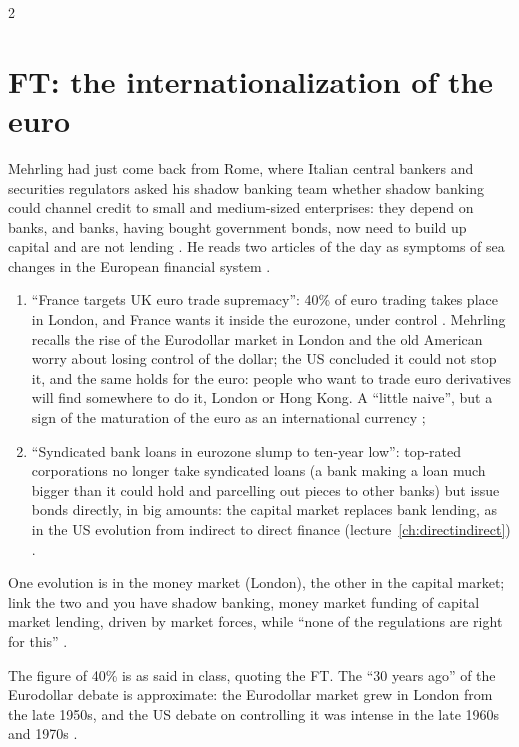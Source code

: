 \begin{paracol}{2}
\section{FT: the internationalization of the euro}\label{sec:cds-ft}

Mehrling had just come back from Rome, where Italian central bankers and securities regulators asked his shadow banking team whether shadow banking could channel
credit to small and medium-sized enterprises: they depend on banks, and banks, having bought government bonds, now need to build up capital and are not lending
. He reads two articles of the day as symptoms of sea changes in the European financial system
.

\begin{casestudy}
\begin{enumerate}
  \item ``France targets UK euro trade supremacy'': 40\% of euro trading takes place in London, and France wants it inside the eurozone, under control
        . Mehrling recalls the rise of the Eurodollar market in London and the old American worry about losing control of the dollar;
        the US concluded it could not stop it, and the same holds for the euro: people who want to trade euro derivatives will find somewhere to do it, London or
        Hong Kong. A ``little naive'', but a sign of the maturation of the euro as an international currency ;
  \item ``Syndicated bank loans in eurozone slump to ten-year low'': top-rated corporations no longer take syndicated loans (a bank making a loan much bigger than it
        could hold and parcelling out pieces to other banks) but issue bonds directly, in big amounts: the capital market replaces bank lending, as in the US
        evolution from indirect to direct finance (lecture~\ref{ch:directindirect}) .
\end{enumerate}
One evolution is in the money market (London), the other in the capital market; link the two and you have shadow banking, money market funding of capital market
lending, driven by market forces, while ``none of the regulations are right for this'' .
\end{casestudy}

\begin{coursenote}
The figure of 40\% is as said in class, quoting the FT. The ``30 years ago'' of the Eurodollar debate is approximate: the Eurodollar market grew in London from the
late 1950s, and the US debate on controlling it was intense in the late 1960s and 1970s .
\end{coursenote}


\end{paracol}
